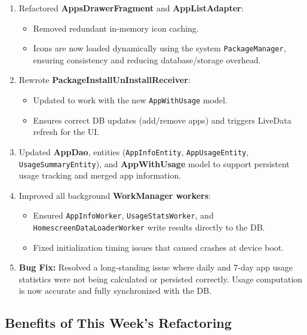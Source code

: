 \documentclass[12pt]{article}
\begin{document}
\begin{enumerate}
\begin{enumerate}
        \item Refactored \textbf{AppsDrawerFragment} and \textbf{AppListAdapter}:
        \begin{itemize}
            \item Removed redundant in-memory icon caching.
            \item Icons are now loaded dynamically using the system \texttt{PackageManager}, ensuring consistency and reducing database/storage overhead.
        \end{itemize}
    
        \item Rewrote \textbf{PackageInstallUnInstallReceiver}:
        \begin{itemize}
            \item Updated to work with the new \texttt{AppWithUsage} model.
            \item Ensures correct DB updates (add/remove apps) and triggers LiveData refresh for the UI.
        \end{itemize}
    
        \item Updated \textbf{AppDao}, entities (\texttt{AppInfoEntity}, \texttt{AppUsageEntity}, \texttt{UsageSummaryEntity}), and \textbf{AppWithUsage} model to support persistent usage tracking and merged app information.
    
        \item Improved all background \textbf{WorkManager workers}:
        \begin{itemize}
            \item Ensured \texttt{AppInfoWorker}, \texttt{UsageStatsWorker}, and \texttt{HomescreenDataLoaderWorker} write results directly to the DB.
            \item Fixed initialization timing issues that caused crashes at device boot.
        \end{itemize}
    
        \item \textbf{Bug Fix:} Resolved a long-standing issue where daily and 7-day app usage statistics were not being calculated or persisted correctly. Usage computation is now accurate and fully synchronized with the DB.
    \end{enumerate}
    \subsection*{Benefits of This Week’s Refactoring}
    \begin{enumerate}
      

\end{enumerate}
\end{enumerate}
\end{document}
